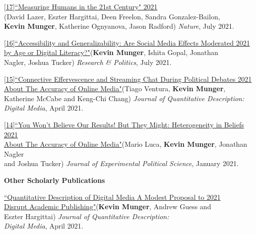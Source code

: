 \documentclass[margin]{res}
\begin{document}
{\href{https://www.nature.com/articles/s41586-021-03660-7}{[17]``Measuring Humans in the 21st Century" \hfill 2021}\\ (David Lazer, Eszter Hargittai, Deen Freelon, Sandra Gonzalez-Bailon, \\\textbf{Kevin Munger}, Katherine Ognyanova, Jason Radford) \textit{Nature}, July 2021.


\href{https://journals.sagepub.com/doi/full/10.1177/20531680211016968}{[16]``Accessibility and Generalizability: Are Social Media Effects Moderated \hfill 2021\\ by Age or Digital Literacy?"}(\textbf{Kevin Munger}, Ishita Gopal, Jonathan\\ Nagler, Joshua Tucker) \textit{Research \& Politics}, July 2021.


\href{https://doi.org/10.51685/jqd.2021.001}{[15]``Connective Effervescence and Streaming Chat During Political Debates
	 	\hfill 2021\\ About The Accuracy of Online Media"}(Tiago Ventura, \textbf{Kevin Munger},\\ Katherine McCabe and Keng-Chi Chang) \textit{Journal of Quantitative Description: \\ Digital Media}, April 2021.


\href{https://www.cambridge.org/core/journals/journal-of-experimental-political-science/article/abs/you-wont-believe-our-results-but-they-might-heterogeneity-in-beliefs-about-the-accuracy-of-online-media/21D4B5483A186891DBFA6F8B6A878D1E}{[14]``You Won't Believe Our Results! But They Might: Heterogeneity in Beliefs 	\hfill 2021\\ About The Accuracy of Online Media"}(Mario Luca, \textbf{Kevin Munger}, Jonathan Nagler\\ and Joshua Tucker) \textit{Journal of Experimental Political Science}, January 2021.




\textbf{Other Scholarly Publications}

\href{https://doi.org/10.51685/jqd.2021.000}{``Quantitative Description of Digital Media
	A Modest Proposal to \hfill 2021\\  Disrupt Academic Publishing"}(\textbf{Kevin Munger}, Andrew Guess and \\ Eszter Hargittai) \textit{Journal of Quantitative Description: \\ Digital Media}, April 2021.





}
\end{document}
